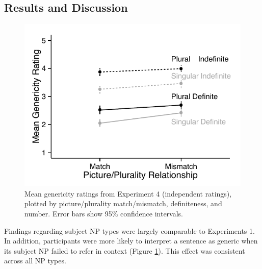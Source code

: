 \documentclass[10pt,letterpaper]{article}
\begin{document}

\subsection{Results and Discussion}


\begin{figure}[t]
\centering
\includegraphics[width=.9\linewidth]{figures/e2b_mod.pdf}
\caption{\label{fig:e2b} Mean genericity ratings from Experiment 4 (independent ratings), plotted by picture/plurality match/mismatch, definiteness, and number. Error bars show 95\% confidence intervals.}
\end{figure}

Findings regarding subject NP types were largely comparable to Experiments 1. In addition, participants were more likely to interpret a sentence as generic when its subject NP failed to refer in context (Figure \ref{fig:e2b}). This effect was consistent across all NP types.
\end{document}
